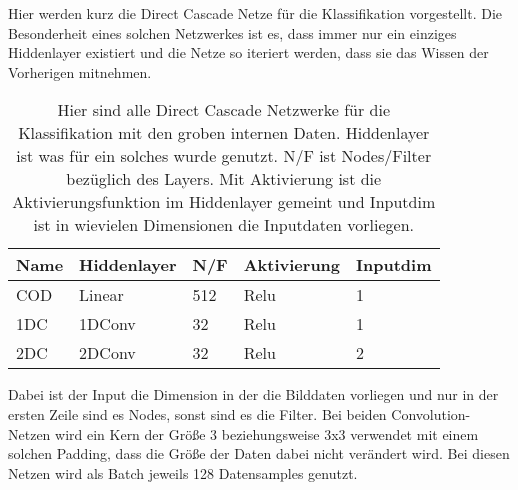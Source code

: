 Hier werden kurz die Direct Cascade Netze für die Klassifikation vorgestellt. Die Besonderheit eines solchen Netzwerkes ist es, dass 
immer nur ein einziges Hiddenlayer existiert und die Netze so iteriert werden, dass sie das Wissen der Vorherigen mitnehmen. 

\begin{table}[h!]
    \centering    
    \begin{tabular}{l|l|l|l|l}
        \textbf{Name} & \textbf{Hiddenlayer} & \textbf{N/F} & \textbf{Aktivierung} & \textbf{Inputdim} \\
        \hline
        COD & Linear & 512 & Relu & 1 \\
        1DC & 1DConv & 32 & Relu & 1 \\
        2DC & 2DConv & 32 & Relu & 2
    \end{tabular}
    \caption{\small{Hier sind alle Direct Cascade Netzwerke für die Klassifikation mit den groben internen Daten. 
    Hiddenlayer ist was für ein solches wurde genutzt. N/F ist Nodes/Filter bezüglich des Layers. Mit Aktivierung ist die 
    Aktivierungsfunktion im Hiddenlayer gemeint und Inputdim ist in wievielen 
    Dimensionen die Inputdaten vorliegen.}}
        \label{tab:classvor}
\end{table}

Dabei ist der Input die Dimension in der die Bilddaten vorliegen und nur in der ersten Zeile sind es Nodes, sonst sind es die Filter. 
Bei beiden Convolution-Netzen wird ein Kern der Größe 3 beziehungsweise 3x3 verwendet mit einem solchen Padding, dass die Größe der Daten 
dabei nicht verändert wird. Bei diesen Netzen wird als Batch jeweils 128 Datensamples genutzt. 

\iffalse
Das ClassOneDense-Netzwerk besitzt ein Linearlayer mit 512 Nodes als Hiddenlayer 
und der Aktivierungsfunktion Relu. Es nimmt als Input eindimensionale Bilddaten. 

Das 1DConv-Netzwerk besitzt ein 1DConv-Layer als Hiddenlayer mit 32 Filtern, einer Kerngröße von 3 und solchem Padding, dass sich die Größe 
der Daten nicht verändert. Zudem wird die Aktivierungsfunktion Relu genutzt und eindimensionale Bilddaten. 

Das 2DConv-Netzwerk besitzt ein 2DConv-Layer als Hiddenlayer mit 32 Filtern, einer Kerngröße von 3x3 und einem Padding, sodass die Datengröße 
nicht verändert wird. Es wird als Aktivierungsfunktion Relu genutzt und als Input zweidimensionale Bilddaten. 
\fi
